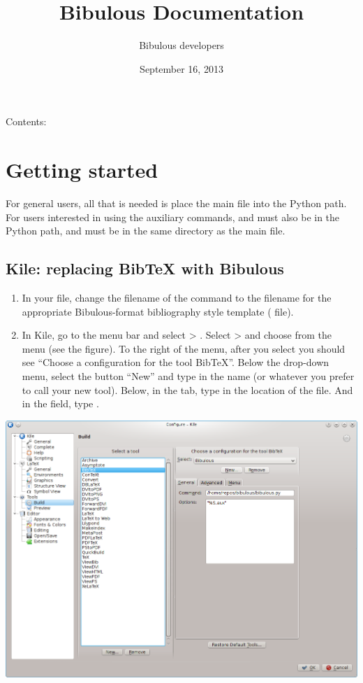 \documentclass[letterpaper,10pt,english]{sphinxmanual}
\title{Bibulous Documentation}
\date{September 16, 2013}
\author{Bibulous developers}
\begin{document}
\maketitle
\tableofcontents
{}\label{index::doc}


Contents:


\chapter{Getting started}
\label{getting_started:bibulous-documentation}\label{getting_started:getting-started}\label{getting_started::doc}
For general users, all that is needed is place the main  file into the Python path. For users interested in using the auxiliary commands,  and  must also be in the Python path, and must be in the same directory as the main file.


\section{Kile: replacing BibTeX with Bibulous}
\label{getting_started:kile-replacing-bibtex-with-bibulous}\begin{enumerate}
\item {} 
In your  file, change the filename of the  command to the filename for the appropriate Bibulous-format bibliography style template ( file).

\item {} 
In Kile, go to the menu bar and select  \textgreater{} . Select  \textgreater{}  and choose  from the  menu (see the figure). To the right of the menu, after you select  you should see ``Choose a configuration for the tool BibTeX''. Below the drop-down menu, select the button ``New'' and type in the name  (or whatever you prefer to call your new tool). Below, in the  tab, type in the location of the  file. And in the  field, type .

\end{enumerate}

\includegraphics[width=0.490\linewidth]{screenshot_for_kile_instructions.png}
\end{document}
